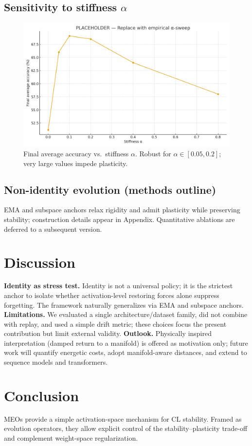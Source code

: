\documentclass[11pt]{article}
\begin{document}
\subsection{Sensitivity to stiffness $\alpha$}
\begin{figure}[h]
\centering
\includegraphics[width=.8\linewidth]{alpha_sweep_placeholder.png}
\caption{Final average accuracy vs.\ stiffness $\alpha$. Robust for $\alpha\in[0.05,0.2]$; very large values impede plasticity.}
\end{figure}

\subsection{Non-identity evolution (methods outline)}
EMA and subspace anchors relax rigidity and admit plasticity while preserving stability; construction details appear in Appendix. Quantitative ablations are deferred to a subsequent version.

\section{Discussion}
\textbf{Identity as stress test.} Identity is not a universal policy; it is the strictest anchor to isolate whether activation-level restoring forces alone suppress forgetting. The framework naturally generalizes via EMA and subspace anchors. \textbf{Limitations.} We evaluated a single architecture/dataset family, did not combine with replay, and used a simple drift metric; these choices focus the present contribution but limit external validity. \textbf{Outlook.} Physically inspired interpretation (damped return to a manifold) is offered as motivation only; future work will quantify energetic costs, adopt manifold-aware distances, and extend to sequence models and transformers.

\section{Conclusion}
MEOs provide a simple activation-space mechanism for CL stability. Framed as evolution operators, they allow explicit control of the stability--plasticity trade-off and complement weight-space regularization.
\end{document}
